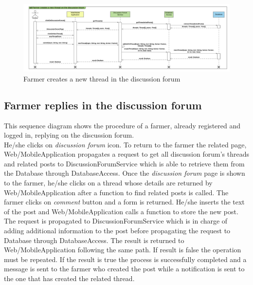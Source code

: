 \newpage
\begin{landscape}
\begin{figure}[t!]
\vspace*{2cm}
\noindent
\centering
\centerline{\includegraphics[scale= 0.108]{./Images/Sequence diagram/Farmer creates a new thread on the discussion forum.png}}
    \caption{Farmer creates a new thread in the discussion forum}
    \vspace*{-12cm}
\end{figure}
\fillandplacepagenumber
\end{landscape}

\subsection{Farmer replies in the discussion forum}

This sequence diagram shows the procedure of a farmer, already registered and logged in, replying on the discussion forum.\\
He/she clicks on \textit{discussion forum} icon. To return to the farmer the related page, Web/MobileApplication propagates a request to get all discussion forum's threads and related posts to DiscussionForumService which is able to retrieve them from the Database through DatabaseAccess. 
Once the \textit{discussion forum} page is shown to the farmer, he/she clicks on a thread whose details are returned by Web/MobileApplication after a function to find related posts is called. The farmer clicks on \textit{comment} button and a form is returned. He/she inserts the text of the post and Web/MobileApplication calls a function to store the new post. The request is propagated to DiscussionForumService which is in charge of  adding additional information to the post before propagating the request to Database through DatabaseAccess. The result is returned to Web/MobileApplication following the same path. If result is false the operation must be repeated. If the result is true the process is successfully completed and a message is sent to the farmer who created the post while a notification is sent to the one that has created the related thread. 

